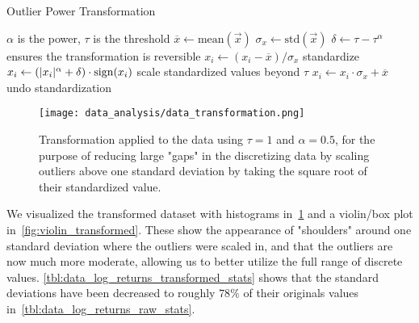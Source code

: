 \begin{algorithm}
    \caption{Outlier Power Transformation}
\begin{algorithmic}[1]
            \Comment $\alpha$ is the power, $\tau$ is the threshold
        \State $\overline{x} \gets \text{mean}(\vec{x})$
        \State $\sigma_{x} \gets \text{std}(\vec{x})$
        \State $\delta \gets \tau - \tau^\alpha$
            \Comment ensures the transformation is reversible
            \State $x_i \gets (x_i - \overline{x}) / \sigma_x$
                \Comment standardize
                \State $x_i \gets (\lvert x_i\rvert^\alpha + \delta) \cdot \text{sign}(x_i)$
                    \Comment scale standardized values beyond $\tau$
            \EndIf
            \State $x_i \gets x_i \cdot \sigma_x + \overline{x}$
                \Comment undo standardization
        \EndFor
    \EndProcedure
\end{algorithmic}
\label{alg:transformation}
\end{algorithm}

\begin{figure}[!htb]
    \begin{center}
        \texttt{[image: data\_analysis/data\_transformation.png]}
    \end{center}
    \caption{Transformation applied to the data using \( \tau = 1 \) and \( \alpha = 0.5 \), for the purpose of reducing large "gaps" in the discretizing data by scaling outliers above one standard deviation by taking the square root of their standardized value.}
    \label{fig:data_transformation}
\end{figure}

We visualized the transformed dataset with histograms in~\cref{fig:data_transformation} and a violin/box plot in~\cref{fig:violin_transformed}.
These show the appearance of "shoulders" around one standard deviation where the outliers were scaled in, and that the outliers are now much more moderate, allowing us to better utilize the full range of discrete values.
\cref{tbl:data_log_returns_transformed_stats} shows that the standard deviations have been decreased to roughly \( 78\% \) of their originals values in~\cref{tbl:data_log_returns_raw_stats}.

